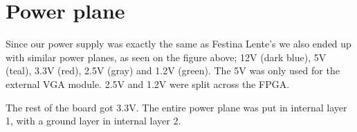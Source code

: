 \section {Power plane}



Since our power supply was exactly the same as Festina Lente's we also ended up
with similar power planes, as seen on the figure above; 12V (dark blue), 5V (teal), 
3.3V (red), 2.5V (gray) and 1.2V (green). The 5V was only used for the external 
\ac{VGA} module. 2.5V and 1.2V were split across the \ac{FPGA}.

The rest of the board got 3.3V. The entire power plane was put in internal layer
1, with a ground layer in internal layer 2.
